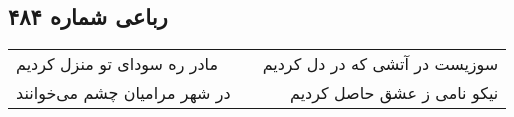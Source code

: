 \begin{center}
\section*{رباعی شماره ۴۸۴}
\label{sec:sh484}
\begin{longtable}{l p{0.5cm} r}
مادر ره سودای تو منزل کردیم
&&
سوزیست در آتشی که در دل کردیم
\\
در شهر مرامیان چشم می‌خوانند
&&
نیکو نامی ز عشق حاصل کردیم
\\
\end{longtable}
\end{center}
